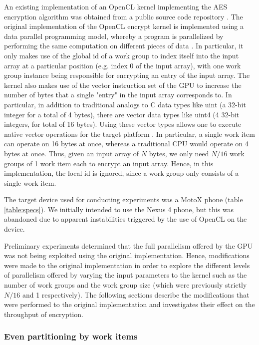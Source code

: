 \documentclass[conference,10pt]{IEEEtran}
\begin{document}
An existing implementation of an OpenCL kernel implementing the AES encryption algorithm was 
obtained from a public source code repository \cite{opencl_impl}.  The original implementation of 
the OpenCL encrypt kernel is implemented using a data parallel programming model, whereby a program 
is parallelized by performing the same computation on different pieces of data \cite{opencl_guide}. 
In particular, it only makes use of the global id of a work group to index itself into the input 
array at a particular position (e.g. index 0 of the input array), with one work group instance being 
responsible for encrypting an entry of the input array. The kernel also makes use of the vector 
instruction set of the GPU to increase the number of bytes that a single "entry" in the input array 
corresponds to. In particular, in addition to traditional analogs to C data types like uint (a 
32-bit integer for a total of 4 bytes), there are vector data types like uint4 (4 32-bit integers, 
for total of 16 bytes). Using these vector types allows one to execute native vector operations for 
the target platform \cite{opencl_guide}.  In particular, a single work item can operate on 16 bytes 
at once, whereas a traditional CPU would operate on 4 bytes at once. Thus, given an input array of 
$N$ bytes, we only need $N/16$ work groups of 1 work item each to encrypt an input array. Hence, in 
this implementation, the local id is ignored, since a work group only consists of a single work 
item.

The target device used for conducting experiments was a MotoX phone (table \ref{table:specs}).  We 
initially intended to use the Nexus 4 phone, but this was abandoned due to apparent instabilities 
triggered by the use of OpenCL on the device. 

Preliminary experiments determined that the full parallelism offered by the GPU was not being 
exploited using the original implementation.  Hence, modifications were made to the original 
implementation in order to explore the different levels of parallelism offered by varying the input 
parameters to the kernel such as the number of work groups and the work group size (which were 
previously strictly $N/16$ and 1 respectively).  The following sections describe the modifications 
that were performed to the original implementation and investigates their effect on the throughput 
of encryption.

\subsubsection{Even partitioning by work items}
\label{subsec:impl_partition}
\end{document}
